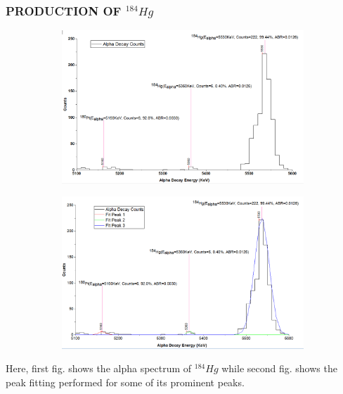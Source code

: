 \documentclass[12pt]{article}
\begin{document}
\subsubsection{PRODUCTION OF $^{184}Hg$}
\begin{figure}[h]
\centering
\begin{subfigure}
\centering
\includegraphics[scale=0.49]{Hg184.png}
\end{subfigure}
\hfill
\begin{subfigure}
\centering
\includegraphics[scale=0.49]{Hg184(Peak Fitting).png}
\end{subfigure}
\label{First fig shows the alpha spectrum of Hg 184 and second fig shows the peak fitting for its prominent peaks.}
\end{figure}
Here, first fig. shows the alpha spectrum of $^{184}Hg$ while second fig. shows the peak fitting performed for some of its prominent peaks.
\clearpage
\end{document}
